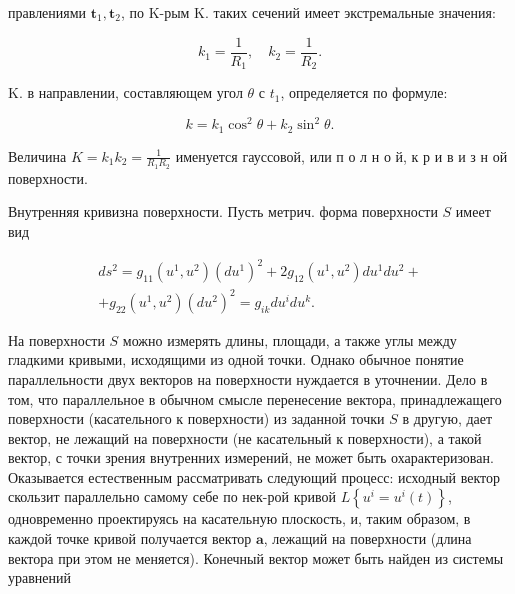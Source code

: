 \documentclass[10pt]{article}
\begin{document}
правлениями $\boldsymbol{t}_{1}, \boldsymbol{t}_{2}$, по K-рым K. таких сечений имеет экстремальные значения:



\[

k_{1}=\frac{1}{R_{1}}, \quad k_{2}=\frac{1}{R_{2}} .

\]



K. в направлении, составляющем угол $\theta$ с $t_{1}$, определяется по формуле:



\[

k=k_{1} \cos ^{2} \theta+k_{2} \sin ^{2} \theta .

\]



Величина $K=k_{1} k_{2}=\frac{1}{R_{1} R_{2}}$ именуется гауссовой, или п о л н о й, к р и в и з н ой поверхности.



Внутренняя кривизна поверхности. Пусть метрич. форма поверхности $S$ имеет вид



\[

\begin{gathered}

d s^{2}=g_{11}\left(u^{1}, u^{2}\right)\left(d u^{1}\right)^{2}+2 g_{12}\left(u^{1}, u^{2}\right) d u^{1} d u^{2}+ \\

+g_{22}\left(u^{1}, u^{2}\right)\left(d u^{2}\right)^{2}=g_{i k} d u^{i} d u^{k} .

\end{gathered}

\]



На поверхности $S$ можно измерять длины, площади, а также углы между гладкими кривыми, исходящими из одной точки. Однако обычное понятие параллельности двух векторов на поверхности нуждается в уточнении. Дело в том, что параллельное в обычном смысле перенесение вектора, принадлежащего поверхности (касательного к поверхности) из заданной точки $S$ в другую, дает вектор, не лежащий на поверхности (не касательный к поверхности), а такой вектор, с точки зрения внутренних измерений, не может быть охарактеризован. Оказывается естественным рассматривать следующий процесс: исходный вектор скользит параллельно самому себе по нек-рой кривой $L\left\{u^{i}=u^{i}(t)\right\}$, одновременно проектируясь на касательную плоскость, и, таким образом, в каждой точке кривой получается вектор $\boldsymbol{a}$, лежащий на поверхности (длина вектора при этом не меняется). Конечный вектор может быть найден из системы уравнений
\end{document}
